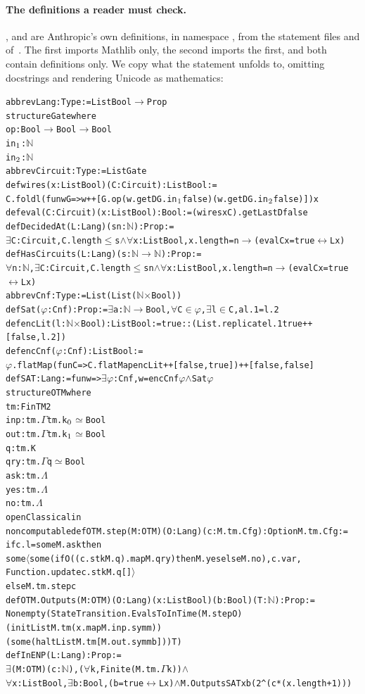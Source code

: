 \documentclass[10pt]{amsart}
\theoremstyle{plain}
\theoremstyle{definition}
\theoremstyle{remark}
\numberwithin{equation}{section}
\begin{document}
\paragraph{The definitions a reader must check.} ,  and  are
Anthropic's own definitions, in namespace , from the statement files
 and
 of~\cite{Anthropic26}.
The first imports Mathlib only, the second imports the first, and both contain definitions only. We copy what the statement unfolds to,
omitting docstrings and rendering Unicode as mathematics:
\begin{alltt}\footnotesize
abbrev Lang : Type := List Bool \(\to\) Prop
structure Gate where
  op : Bool \(\to\) Bool \(\to\) Bool
  in\(\sb{1}\) : \(\mathbb{N}\)
  in\(\sb{2}\) : \(\mathbb{N}\)
abbrev Circuit : Type := List Gate
def wires (x : List Bool) (C : Circuit) : List Bool :=
  C.foldl (fun w G => w ++ [G.op (w.getD G.in\(\sb{1}\) false) (w.getD G.in\(\sb{2}\) false)]) x
def eval (C : Circuit) (x : List Bool) : Bool := (wires x C).getLastD false
def DecidedAt (L : Lang) (s n : \(\mathbb{N}\)) : Prop :=
  \(\exists\) C : Circuit, C.length \(\le\) s \(\wedge\) \(\forall\) x : List Bool, x.length = n \(\to\) (eval C x = true \(\leftrightarrow\) L x)
def HasCircuits (L : Lang) (s : \(\mathbb{N}\) \(\to\) \(\mathbb{N}\)) : Prop :=
  \(\forall\) n : \(\mathbb{N}\), \(\exists\) C : Circuit, C.length \(\le\) s n \(\wedge\) \(\forall\) x : List Bool, x.length = n \(\to\) (eval C x = true \(\leftrightarrow\) L x)
abbrev Cnf : Type := List (List (\(\mathbb{N}\) \(\times\) Bool))
def Sat (\(\varphi\) : Cnf) : Prop := \(\exists\) a : \(\mathbb{N}\) \(\to\) Bool, \(\forall\) C \(\in\) \(\varphi\), \(\exists\) l \(\in\) C, a l.1 = l.2
def encLit (l : \(\mathbb{N}\) \(\times\) Bool) : List Bool := true :: (List.replicate l.1 true ++ [false, l.2])
def encCnf (\(\varphi\) : Cnf) : List Bool :=
  \(\varphi\).flatMap (fun C => C.flatMap encLit ++ [false, true]) ++ [false, false]
def SAT : Lang := fun w => \(\exists\) \(\varphi\) : Cnf, w = encCnf \(\varphi\) \(\wedge\) Sat \(\varphi\)
structure OTM where
  tm : FinTM2
  inp : tm.\(\Gamma\) tm.k\(\sb{0}\) \(\simeq\) Bool
  out : tm.\(\Gamma\) tm.k\(\sb{1}\) \(\simeq\) Bool
  q : tm.K
  qry : tm.\(\Gamma\) q \(\simeq\) Bool
  ask : tm.\(\Lambda\)
  yes : tm.\(\Lambda\)
  no : tm.\(\Lambda\)
open Classical in
noncomputable def OTM.step (M : OTM) (O : Lang) (c : M.tm.Cfg) : Option M.tm.Cfg :=
  if c.l = some M.ask then
    some \(\langle\)some (if O ((c.stk M.q).map M.qry) then M.yes else M.no), c.var,
      Function.update c.stk M.q []\(\rangle\)
  else M.tm.step c
def OTM.Outputs (M : OTM) (O : Lang) (x : List Bool) (b : Bool) (T : \(\mathbb{N}\)) : Prop :=
  Nonempty (StateTransition.EvalsToInTime (M.step O) (initList M.tm (x.map M.inp.symm))
    (some (haltList M.tm [M.out.symm b])) T)
def InENP (L : Lang) : Prop :=
  \(\exists\) (M : OTM) (c : \(\mathbb{N}\)), (\(\forall\) k, Finite (M.tm.\(\Gamma\) k)) \(\wedge\)
    \(\forall\) x : List Bool, \(\exists\) b : Bool, (b = true \(\leftrightarrow\) L x) \(\wedge\) M.Outputs SAT x b (2 ^ (c * (x.length + 1)))
\end{alltt}
\end{document}
